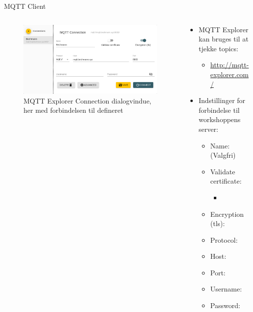 \documentclass[aspectratio=169]{beamer}
\begin{document}
\begin{frame}{MQTT Client}
\begin{columns}
\begin{column}{0.6\textwidth}
		\centering
		\begin{figure}
  			\includegraphics[width=\textwidth]{assets/pictures/mqtt-explorer.png}
  			\caption{MQTT Explorer Connection dialogvindue, her med forbindelsen til  defineret}
  			\label{fig:mqtt-explorer}
		\end{figure}
	\end{column}
	\begin{column}{0.4\textwidth}
		\begin{textBox}
		\begin{itemize}
			\item MQTT Explorer kan bruges til at tjekke topics:
			\begin{itemize}
				\item \small\url{http://mqtt-explorer.com/}
			\end{itemize}
			\item Indstillinger for forbindelse til workshoppens  server:
			\begin{itemize}
				\item Name:  (Valgfri)	
				\item Validate certificate:	  
				\begin{itemize}
					\item {}
				\end{itemize}
				\item Encryption (tls):	  
				\item Protocol: 
				\item Host: 
				\item Port: 
				\item Username: 
				\item Password: 
			\end{itemize}
		\end{itemize}
		\end{textBox}
	\end{column}
\end{columns}
\end{frame}
\end{document}

